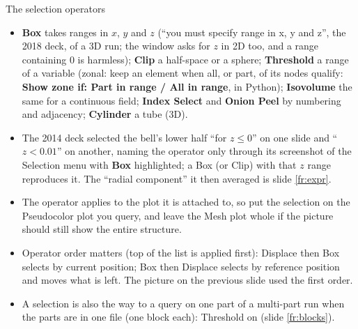 \documentclass[aspectratio=169,11pt]{beamer}
\newcommand{\gui}[1]{\textsf{\textbf{#1}}}
\begin{document}
\begin{frame}{The selection operators}
\label{fr:select2}
\footnotesize
\begin{itemize}
  \item \gui{Box} takes ranges in $x$, $y$ and $z$ (``you must specify range in x, y and z'', the 2018 deck, of a 3D run; the window asks for $z$ in 2D too, and a range containing $0$ is harmless); \gui{Clip} a half-space or a sphere; \gui{Threshold} a range of a variable (zonal: keep an element when all, or part, of its nodes qualify: \gui{Show zone if: Part in range / All in range},  in Python); \gui{Isovolume} the same for a continuous field; \gui{Index Select} and \gui{Onion Peel} by numbering and adjacency; \gui{Cylinder} a tube (3D).
  \item The 2014 deck selected the bell's lower half ``for $z \le 0$'' on one slide and ``$z < 0.01$'' on another, naming the operator only through its screenshot of the Selection menu with \gui{Box} highlighted; a Box (or Clip) with that $z$ range reproduces it. The ``radial component'' it then averaged is slide \ref{fr:expr}.
  \item The operator applies to the plot it is attached to, so put the selection on the Pseudocolor plot you query, and leave the Mesh plot whole if the picture should still show the entire structure.
  \item Operator order matters (top of the list is applied first): Displace then Box selects by current position; Box then Displace selects by reference position and moves what is left. The picture on the previous slide used the first order.
  \item A selection is also the way to a query on one part of a multi-part run when the parts are in one file (one block each): Threshold on  (slide \ref{fr:blocks}).
\end{itemize}
\end{frame}
\end{document}
